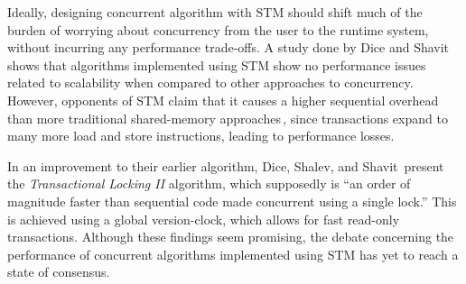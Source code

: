 Ideally, designing concurrent algorithm with STM should shift much of the burden of worrying about concurrency from the user to the runtime system, without incurring any performance trade-offs. A study done by Dice and Shavit\,\citep{Dice06whatreally} shows that algorithms implemented using STM show no performance issues related to scalability when compared to other approaches to concurrency. However, opponents of STM claim that it causes a higher sequential overhead than more traditional shared-memory approaches\,\citep{Cascaval08}, since transactions expand to many more load and store instructions, leading to performance losses.

In an improvement to their earlier algorithm, Dice, Shalev, and Shavit\,\citep{DiceTLII} present the \emph{Transactional Locking II} algorithm, which supposedly is ``an order of magnitude faster than sequential code made concurrent using a single lock.'' This is achieved using a global version-clock, which allows for fast read-only transactions. Although these findings seem promising, the debate concerning the performance of concurrent algorithms implemented using STM has yet to reach a state of consensus.
